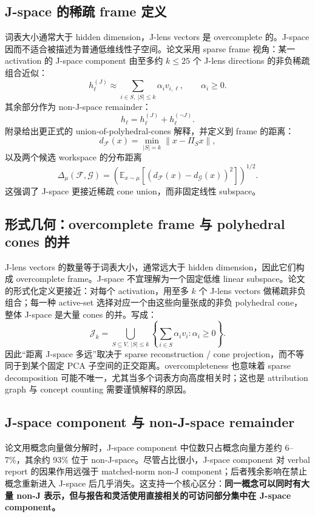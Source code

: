 \documentclass[10.5pt,a4paper]{ctexart}
\begin{document}
\subsection{J-space 的稀疏 frame 定义}
词表大小通常大于 hidden dimension，J-lens vectors 是 overcomplete 的。J-space 因而不适合被描述为普通低维线性子空间。论文采用 sparse frame 视角：某一 activation 的 J-space component 由至多约 $k\le 25$ 个 J-lens directions 的非负稀疏组合近似：
\[
h_\ell^{(J)}\approx \sum_{i\in S,\ |S|\le k}\alpha_i v_{i,\ell},\qquad \alpha_i\ge 0.
\]
其余部分作为 non-J-space remainder：
\[
h_\ell=h_\ell^{(J)}+h_\ell^{(\neg J)}.
\]
附录给出更正式的 union-of-polyhedral-cones 解释，并定义到 frame 的距离：
\[
d_{\mathcal F}(x)=\min_{|S|=k}\|x-\Pi_Sx\|,
\]
以及两个候选 workspace 的分布距离
\[
\Delta_\mu(\mathcal F,\mathcal G)
=
\left(
\mathbb E_{x\sim\mu}
[(d_\mathcal F(x)-d_\mathcal G(x))^2]
\right)^{1/2}.
\]
这强调了 J-space 更接近稀疏 cone union，而非固定线性 subspace。


\subsection{形式几何：overcomplete frame 与 polyhedral cones 的并}
J-lens vectors 的数量等于词表大小，通常远大于 hidden dimension，因此它们构成 overcomplete frame。J-space 不宜理解为一个固定低维 linear subspace。论文的形式化定义更接近：对每个 activation，用至多 $k$ 个 J-lens vectors 做稀疏非负组合；每一种 active-set 选择对应一个由这些向量张成的非负 polyhedral cone，整体 J-space 是大量 cones 的并。写成：
\[
\mathcal J_k
=
\bigcup_{S\subseteq V,\,|S|\le k}
\left\{
\sum_{i\in S}\alpha_i v_i:\alpha_i\ge0
\right\}.
\]
因此“距离 J-space 多远”取决于 sparse reconstruction / cone projection，而不等同于到某个固定 PCA 子空间的正交距离。overcompleteness 也意味着 sparse decomposition 可能不唯一，尤其当多个词表方向高度相关时；这也是 attribution graph 与 concept counting 需要谨慎解释的原因。

\subsection{J-space component 与 non-J-space remainder}
论文用概念向量做分解时，J-space component 中位数只占概念向量方差约 6--7\%，其余约 93\% 位于 non-J-space。尽管占比很小，J-space component 对 verbal report 的因果作用远强于 matched-norm non-J component；后者残余影响在禁止概念重新进入 J-space 后几乎消失。这支持一个核心区分：\textbf{同一概念可以同时有大量 non-J 表示，但与报告和灵活使用直接相关的可访问部分集中在 J-space component。}
\end{document}

